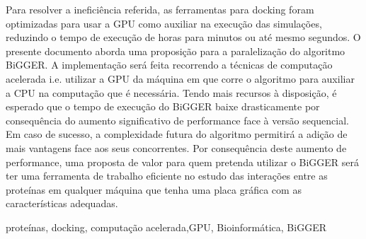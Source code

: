 Para resolver a ineficiência referida, as ferramentas para docking foram optimizadas para usar a GPU como auxiliar na execução das simulações, reduzindo o tempo de execução de horas para minutos ou até mesmo segundos.
O presente documento aborda uma proposição para a paralelização do algoritmo BiGGER.
 A implementação será feita recorrendo a técnicas de computação acelerada i.e. utilizar a GPU da máquina em que corre o algoritmo para auxiliar a CPU na computação que é necessária. 
 Tendo mais recursos à disposição, é esperado que o tempo de execução do BiGGER baixe drasticamente por consequência do aumento significativo de performance face à versão sequencial.
Em caso de sucesso, a complexidade futura do algoritmo permitirá a adição de mais vantagens face aos seus concorrentes.
Por consequência deste aumento de performance, uma proposta de valor para quem pretenda utilizar o BiGGER será ter uma ferramenta de trabalho eficiente no estudo das interações entre as proteínas em qualquer máquina que tenha uma placa gráfica com as características adequadas.
%
%
%


\begin{keywords}
proteínas, docking, computação acelerada,GPU, Bioinformática, BiGGER
\end{keywords}
